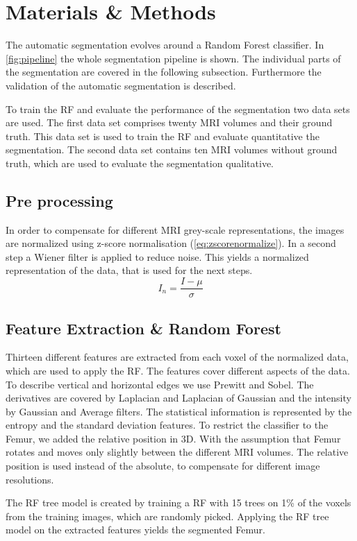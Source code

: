 \section{Materials \& Methods}
The automatic segmentation evolves around a Random Forest classifier. In \autoref{fig:pipeline} the whole segmentation pipeline is shown. The individual parts of the segmentation are covered in the following subsection. Furthermore the validation of the automatic segmentation is described.

To train the RF and evaluate the performance of the segmentation two data sets are used. The first data set comprises twenty MRI volumes and their ground truth. This data set is used to train the RF and evaluate quantitative the segmentation. The second data set contains ten MRI volumes without ground truth, which are used to evaluate the segmentation qualitative.
\subsection{Pre processing}
In order to compensate for different MRI grey-scale representations, the images are normalized using z-score normalisation (\autoref{eq:zscorenormalize}). In a second step a Wiener filter is applied to reduce noise. This yields a normalized representation of the data, that is used for the next steps.
\begin{equation}
I_n = \frac{I - \mu}{\sigma}
\label{eq:zscorenormalize}
\end{equation}
\subsection{Feature Extraction \& Random Forest}
Thirteen different features are extracted from each voxel of the normalized data, which are used to apply the RF. The features cover different aspects of the data. To describe vertical and horizontal edges we use Prewitt and Sobel. The derivatives are covered by Laplacian and Laplacian of Gaussian and the intensity by Gaussian and Average filters. The statistical information is represented by the entropy and the standard deviation features. To restrict the classifier to the Femur, we added the relative position in 3D. With the assumption that Femur rotates and moves only slightly between the different MRI volumes. The relative position is used instead of the absolute, to compensate for different image resolutions.

The RF tree model is created by training a RF with 15 trees on 1\% of the voxels from the training images, which are randomly picked. Applying the RF tree model on the extracted features yields the segmented Femur.
